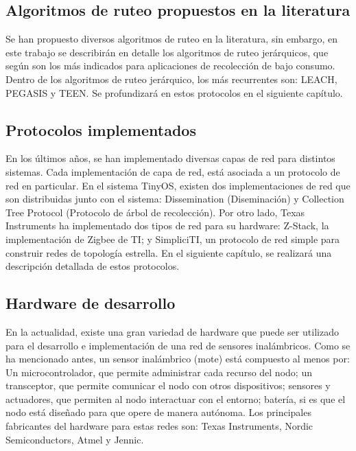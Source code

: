 \subsection{Algoritmos de ruteo propuestos en la literatura}
Se han propuesto diversos algoritmos de ruteo en la literatura, sin embargo, en este trabajo se describirán en detalle los algoritmos de ruteo jerárquicos, que según \cite{WSNSurvey} son los más indicados para aplicaciones de recolección de bajo consumo. Dentro de los algoritmos de ruteo jerárquico, los más recurrentes son: LEACH, PEGASIS y TEEN. Se profundizará en estos protocolos en el siguiente capítulo.


\subsection{Protocolos implementados}
En los últimos años, se han implementado diversas capas de red para distintos sistemas.  Cada implementación de capa de red, está asociada a un protocolo de red en particular. En el sistema TinyOS, existen dos implementaciones de red que son distribuidas junto con el sistema: Dissemination (Diseminación) y Collection Tree Protocol (Protocolo de árbol de recolección). Por otro lado, Texas Instruments ha implementado dos tipos de red para su hardware: Z-Stack, la implementación de Zigbee de TI; y SimpliciTI, un protocolo de red simple para construir redes de topología estrella. En el siguiente capítulo, se realizará una descripción detallada de estos protocolos.

\subsection{Hardware de desarrollo}
En la actualidad, existe una gran variedad de hardware que puede ser utilizado para el desarrollo e implementación de una red de sensores inalámbricos. Como se ha mencionado antes, un sensor inalámbrico (mote) está compuesto al menos por: Un microcontrolador, que permite administrar cada recurso del nodo; un transceptor, que permite comunicar el nodo con otros dispositivos; sensores y actuadores, que permiten al nodo interactuar con el entorno; batería, si es que el nodo está diseñado para que opere de manera autónoma. Los principales fabricantes del hardware para estas redes son: Texas Instruments, Nordic Semiconductors, Atmel y Jennic.\\

